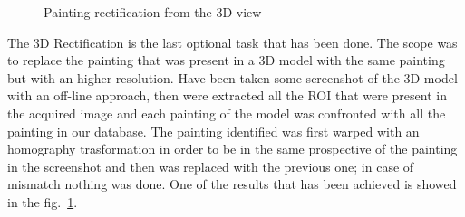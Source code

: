 \begin{figure}[h!]
{{    \endminipage\hfill}
    }
    \caption{Painting rectification from the 3D view}\label{fig:3d-warping}
\end{figure}


The 3D Rectification is the last optional task that has been done. The scope was to replace the painting that was present in a 3D model with the same painting but with an higher resolution. Have been taken some screenshot of the 3D model with an off-line approach, then were extracted all the ROI that were present in the acquired image and each painting of the model was confronted with all the painting in our database. The painting identified was first warped with an homography trasformation in order to be in the same prospective of the painting in the screenshot and then was replaced with the previous one; in case of mismatch nothing was done. One of the results that has been achieved is showed in the fig.~\ref{fig:3d-warping}.
